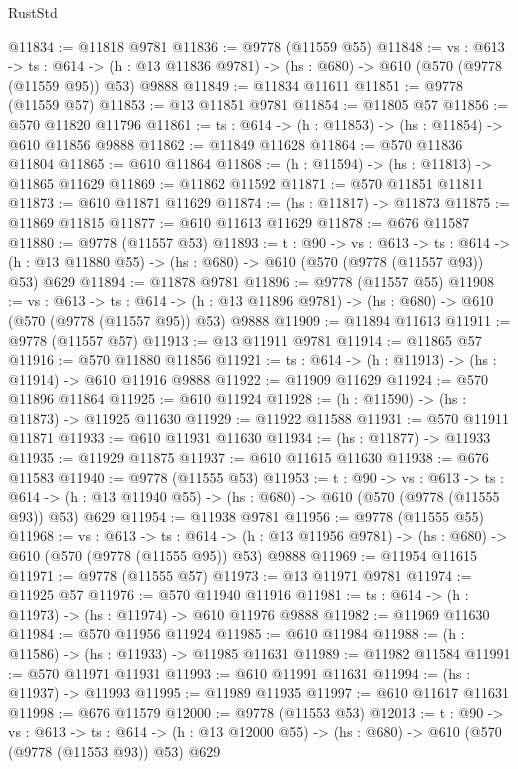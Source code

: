 \begin{lexlean}{RustStd}
\begin{coremodule}
@11834 := @11818 @9781
@11836 := @9778 (@11559 @55)
@11848 := {vs : @613} ->
  {ts : @614} -> (h : @13 @11836 @9781) -> (hs : @680) -> @610 (@570 (@9778 (@11559 @95)) @53) @9888
@11849 := @11834 @11611
@11851 := @9778 (@11559 @57)
@11853 := @13 @11851 @9781
@11854 := @11805 @57
@11856 := @570 @11820 @11796
@11861 := {ts : @614} -> (h : @11853) -> (hs : @11854) -> @610 @11856 @9888
@11862 := @11849 @11628
@11864 := @570 @11836 @11804
@11865 := @610 @11864
@11868 := (h : @11594) -> (hs : @11813) -> @11865 @11629
@11869 := @11862 @11592
@11871 := @570 @11851 @11811
@11873 := @610 @11871 @11629
@11874 := (hs : @11817) -> @11873
@11875 := @11869 @11815
@11877 := @610 @11613 @11629
@11878 := @676 @11587
@11880 := @9778 (@11557 @53)
@11893 := {t : @90} ->
  {vs : @613} ->
  {ts : @614} -> (h : @13 @11880 @55) -> (hs : @680) -> @610 (@570 (@9778 (@11557 @93)) @53) @629
@11894 := @11878 @9781
@11896 := @9778 (@11557 @55)
@11908 := {vs : @613} ->
  {ts : @614} -> (h : @13 @11896 @9781) -> (hs : @680) -> @610 (@570 (@9778 (@11557 @95)) @53) @9888
@11909 := @11894 @11613
@11911 := @9778 (@11557 @57)
@11913 := @13 @11911 @9781
@11914 := @11865 @57
@11916 := @570 @11880 @11856
@11921 := {ts : @614} -> (h : @11913) -> (hs : @11914) -> @610 @11916 @9888
@11922 := @11909 @11629
@11924 := @570 @11896 @11864
@11925 := @610 @11924
@11928 := (h : @11590) -> (hs : @11873) -> @11925 @11630
@11929 := @11922 @11588
@11931 := @570 @11911 @11871
@11933 := @610 @11931 @11630
@11934 := (hs : @11877) -> @11933
@11935 := @11929 @11875
@11937 := @610 @11615 @11630
@11938 := @676 @11583
@11940 := @9778 (@11555 @53)
@11953 := {t : @90} ->
  {vs : @613} ->
  {ts : @614} -> (h : @13 @11940 @55) -> (hs : @680) -> @610 (@570 (@9778 (@11555 @93)) @53) @629
@11954 := @11938 @9781
@11956 := @9778 (@11555 @55)
@11968 := {vs : @613} ->
  {ts : @614} -> (h : @13 @11956 @9781) -> (hs : @680) -> @610 (@570 (@9778 (@11555 @95)) @53) @9888
@11969 := @11954 @11615
@11971 := @9778 (@11555 @57)
@11973 := @13 @11971 @9781
@11974 := @11925 @57
@11976 := @570 @11940 @11916
@11981 := {ts : @614} -> (h : @11973) -> (hs : @11974) -> @610 @11976 @9888
@11982 := @11969 @11630
@11984 := @570 @11956 @11924
@11985 := @610 @11984
@11988 := (h : @11586) -> (hs : @11933) -> @11985 @11631
@11989 := @11982 @11584
@11991 := @570 @11971 @11931
@11993 := @610 @11991 @11631
@11994 := (hs : @11937) -> @11993
@11995 := @11989 @11935
@11997 := @610 @11617 @11631
@11998 := @676 @11579
@12000 := @9778 (@11553 @53)
@12013 := {t : @90} ->
  {vs : @613} ->
  {ts : @614} -> (h : @13 @12000 @55) -> (hs : @680) -> @610 (@570 (@9778 (@11553 @93)) @53) @629

\end{coremodule}
\end{lexlean}
